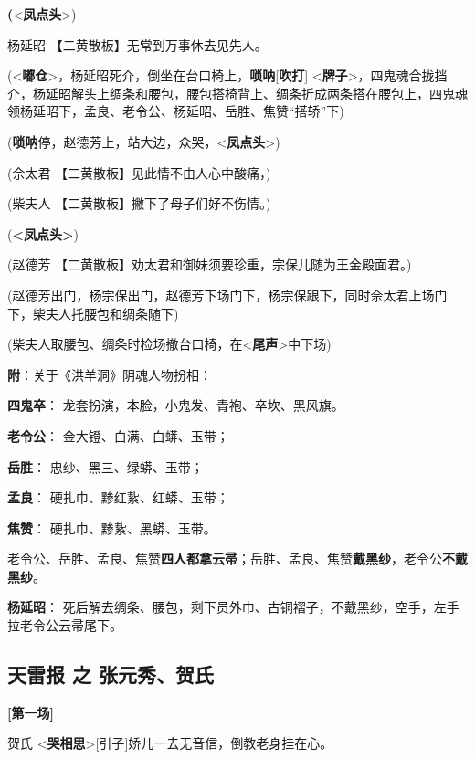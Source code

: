 \textbf{(}\textless{}\textbf{凤点头}\textgreater{})

杨延昭 【二黄散板】无常到万事休去见先人。

(\textless{}\textbf{嘟仓}\textgreater{}，杨延昭死介，倒坐在台口椅上，\textbf{唢呐}{[}\textbf{吹打}{]}
\textless{}\textbf{牌子}\textgreater{}，四鬼魂合拢挡介，杨延昭解头上绸条和腰包，腰包搭椅背上、绸条折成两条搭在腰包上，四鬼魂领杨延昭下，孟良、老令公、杨延昭、岳胜、焦赞``搭轿''下)

(\textbf{唢呐}停，赵德芳上，站大边，众哭，\textless{}\textbf{凤点头}\textgreater{})

(佘太君 【二黄散板】见此情不由人心中酸痛，)

(柴夫人 【二黄散板】撇下了母子们好不伤情。)

(\textbf{\textless{}凤点头\textgreater{}})

(赵德芳 【二黄散板】劝太君和御妹须要珍重，宗保儿随为王金殿面君。)

(赵德芳出门，杨宗保出门，赵德芳下场门下，杨宗保跟下，同时佘太君上场门下，柴夫人托腰包和绸条随下)

(柴夫人取腰包、绸条时检场撤台口椅，在\textless{}\textbf{尾声}\textgreater{}中下场)

\textbf{附}：关于《洪羊洞》阴魂人物扮相：

\textbf{四鬼卒}： 龙套扮演，本脸，小鬼发、青袍、卒坎、黑风旗。

\textbf{老令公}： 金大镫、白满、白蟒、玉带；

\textbf{岳胜}： 忠纱、黑三、绿蟒、玉带；

\textbf{孟良}： 硬扎巾、黪红紥、红蟒、玉带；

\textbf{焦赞}： 硬扎巾、黪紥、黑蟒、玉带。

老令公、岳胜、孟良、焦赞\textbf{四人都拿云帚}；岳胜、孟良、焦赞\textbf{戴黑纱}，老令公\textbf{不戴黑纱}。

\textbf{杨延昭}：
死后解去绸条、腰包，剩下员外巾、古铜褶子，不戴黑纱，空手，左手拉老令公云帚尾下。

\newpage
\hypertarget{ux5929ux96f7ux62a5-ux4e4b-ux5f20ux5143ux79c0ux8d3aux6c0f}{%
\subsection{天雷报 之
张元秀、贺氏}\label{ux5929ux96f7ux62a5-ux4e4b-ux5f20ux5143ux79c0ux8d3aux6c0f}}

\textbf{{[}第一场{]}}

贺氏
\textless{}\textbf{哭相思}\textgreater{}{[}引子{]}娇儿一去无音信，倒教老身挂在心。

